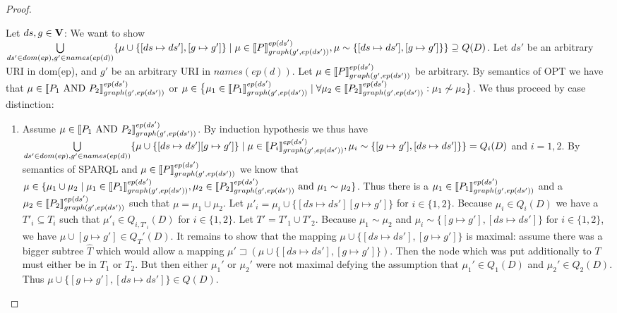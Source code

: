 \begin{proof}
\begin{enumerate}
			\bigskip\noindent
			Let $ds,g \in \mathbf{V}$:
			We want to show  $\bigcup\limits_{ds' \in dom(ep), g' \in names(ep(d))} \{ \mu \cup
			\{[ds \mapsto ds'],[g \mapsto g']\} \mid \mu \in
			\llbracket P\rrbracket^{ep(ds')}_{graph(g',ep(ds'))}, 
			\mu \sim \{[ds\mapsto ds'], [g \mapsto g']\}\} \supseteq Q(D) $. 
			Let $ds'$ be an arbitrary URI in dom(ep), and $g'$ be an arbitrary
			URI in $names(ep(d))$.
			Let $\mu \in \llbracket P \rrbracket^{ep(ds')}_{graph(g',ep(ds'))}$ be arbitrary.
			By semantics of OPT we have that $\mu \in \llbracket P_1 \mbox{ AND } P_2 \rrbracket^{ep(ds')}_{graph(g',ep(ds'))}$ or 
			$\mu \in \big\{ \mu_1 \in  \llbracket P_1 \rrbracket^{ep(ds')}_{graph(g',ep(ds'))} \mid \forall \mu_2 \in \llbracket P_2
				\rrbracket^{ep(ds')}_{graph(g',ep(ds'))}:
			\mu_1 \not\sim \mu_2 \big\}$. 
			We thus proceed by case distinction:
			\begin{enumerate}
				\item Assume $\mu \in \llbracket P_1 \mbox{ AND } P_2 \rrbracket^{ep(ds')}_{graph(g',ep(ds'))}$. 
					By induction hypothesis we thus have 
					$\bigcup\limits_{ds'\in dom(ep),g' \in names(ep(d))} \{ \mu \cup \{[ds \mapsto
						ds'][g \mapsto g']\} \mid \mu \in
						\llbracket P_i\rrbracket^{ep(ds')}_{graph(g',ep(ds'))}, \mu_i \sim
					\{[g\mapsto g'], [ds \mapsto ds']\} \}  = Q_i(D) $ and $i = 1,2$.
					By semantics of SPARQL and $\mu \in \llbracket P
					\rrbracket^{ep(ds')}_{graph(g',ep(ds'))}$ we
					know that $\mu \in \{\mu_1 \cup \mu_2 \mid \mu_1 \in \llbracket P_1
						\rrbracket^{ep(ds')}_{graph(g',ep(ds'))}, \mu_2 \in \llbracket P_2
						\rrbracket^{ep(ds')}_{graph(g',ep(ds'))}
					\mbox{ and } \mu_1 \sim \mu_2 \}$. Thus there is a $\mu_1 \in \llbracket P_1
					\rrbracket^{ep(ds')}_{graph(g',ep(ds'))}$ and a $\mu_2 \in \llbracket P_2
					\rrbracket^{ep(ds')}_{graph(g',ep(ds'))}$ such that $\mu = \mu_1 \cup \mu_2$.
					Let $\mu'_i = \mu_i \cup \{ [ds \mapsto ds'][g \mapsto g']\}$ for $i \in
					\{1,2\}$.  Because $\mu_i \in Q_i(D)$  we have a
					$T'_i \subseteq T_i$ such that $\mu'_i \in Q_{i,T'_i}(D)$ for $i\in \{1,2\}$.
					Let $T' = T'_1 \cup T'_2$.
					Because $\mu_1 \sim \mu_2$ and $\mu_i \sim \{[g \mapsto
					g'],[ds \mapsto ds'] \}$ for
					$i\in\{1,2\}$, we have $\mu \cup [g	\mapsto g'] \in Q_T'(D)$.
					It remains to show that the mapping $\mu\cup \{[ds\mapsto
					ds'], [g\mapsto g'] \}$ is maximal: 
					assume there was a bigger subtree $\hat{T}$ which would allow a mapping 
					$\mu' \sqsupset (\mu\cup \{[ds \mapsto ds'],[g \mapsto g']\})$. Then the
					node which was put additionally to $T$ must either be in $T_1$ or $T_2$.
					But then either $\mu_1'$ or $\mu_2'$ were not maximal defying the assumption
					that $\mu_1' \in Q_1(D)$ and $\mu_2' \in Q_2(D)$.
					Thus $\mu \cup \{[g \mapsto g'],[ds \mapsto ds']\} \in Q(D)$. 



\end{enumerate}
\end{enumerate}
\end{proof}
